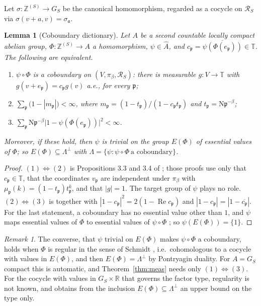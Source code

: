 \documentclass[11pt]{amsart}
\numberwithin{equation}{section}
\newtheorem{lemma}[theorem]{Lemma}
\theoremstyle{definition}
\theoremstyle{remark}
\newtheorem{remark}[theorem]{Remark}
\newcommand{\Z}{\mathbb{Z}}
\newcommand{\R}{\mathbb{R}}
\newcommand{\T}{\mathbb{T}}
\newcommand{\cR}{\mathcal{R}}
\newcommand{\pp}{\mathfrak{p}}
\newcommand{\aaa}{\mathfrak{a}}
\newcommand{\Ns}{\mathrm{N}}
\begin{document}
Let $\sigma:\Z^{(S)}\to G_S$ be the canonical homomorphism, regarded as a cocycle on
$\cR_S$ via $\sigma(v+a,v)=\sigma_\aaa$.

\begin{lemma}[Coboundary dictionary]\label{lem:dict}
Let $A$ be a second countable locally compact abelian group, $\Phi:\Z^{(S)}\to A$ a
homomorphism, $\psi\in\widehat A$, and $c_\pp=\overline{\psi(\Phi(e_\pp))}\in\T$. The
following are equivalent.
\begin{enumerate}
\item $\psi\circ\Phi$ is a coboundary on $(V,\pi_\beta,\cR_S)$: there is measurable
$g:V\to\T$ with $g(v+e_\pp)=c_\pp g(v)$ a.e., for every $\pp$;
\item $\sum_\pp\bigl(1-|m_\pp|\bigr)<\infty$, where $m_\pp=(1-t_\pp)/(1-c_\pp t_\pp)$ and
$t_\pp=\Ns\pp^{-\beta}$;
\item $\sum_\pp\Ns\pp^{-\beta}\bigl|1-\psi(\Phi(e_\pp))\bigr|^2<\infty$.
\end{enumerate}
Moreover, if these hold, then $\psi$ is trivial on the group $E(\Phi)$ of essential values
of $\Phi$; so $E(\Phi)\subseteq\Lambda^\perp$ with
$\Lambda=\{\psi:\psi\circ\Phi\ \text{a coboundary}\}$.
\end{lemma}

\begin{proof}
$(1)\Leftrightarrow(2)$ is Propositions 3.3 and 3.4 of \cite{Main}; those proofs use only
that $c_\pp\in\T$, that the coordinates $v_\pp$ are independent under $\pi_\beta$ with
$\mu_\pp(k)=(1-t_\pp)t_\pp^k$, and that $|g|=1$. The target group of $\psi$ plays no role.
$(2)\Leftrightarrow(3)$ is \cite[Lem.~3.2]{Main} together with
$|1-c_\pp|^2=2(1-\operatorname{Re}c_\pp)$ and $|1-c_\pp|=|1-\overline{c_\pp}|$.
For the last statement, a coboundary has no essential value other than $1$, and
$\psi$ maps essential values of $\Phi$ to essential values of $\psi\circ\Phi$
\cite{Schmidt}; so $\psi(E(\Phi))=\{1\}$.
\end{proof}

\begin{remark}\label{rem:noconverse}
The converse, that $\psi$ trivial on $E(\Phi)$ makes $\psi\circ\Phi$ a coboundary, holds
when $\Phi$ is regular in the sense of Schmidt \cite{Schmidt}, i.e.\ cohomologous to a
cocycle with values in $E(\Phi)$, and then $E(\Phi)=\Lambda^\perp$ by Pontryagin duality.
For $A=G_S$ compact this is automatic, and Theorem~\ref{thm:meas} needs only
$(1)\Leftrightarrow(3)$. For the cocycle with values in $G_S\times\R$ that governs the
factor type, regularity is not known, and \cite[Prop.~2.2 and Rem.~2.3]{SeriesI} obtains
from the inclusion $E(\Phi)\subseteq\Lambda^\perp$ an upper bound on the type only.
\end{remark}
\end{document}
